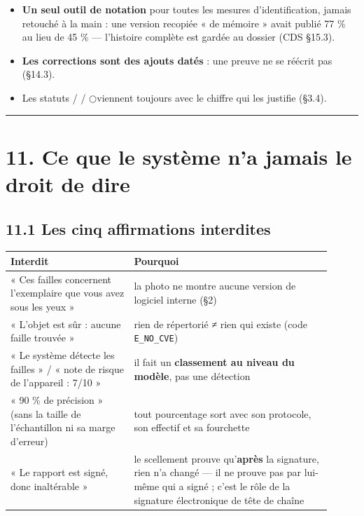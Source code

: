 \documentclass[11pt,a4paper]{article}
\newcommand{\fait}{\textcolor{green!45!black}{\ding{51}}}      %
\newcommand{\encours}{\textcolor{blue!65!black}{\ding{46}}}   %
\newcommand{\afaire}{\textcolor{orange!85!black}{$\bigcirc$}}  %
\begin{document}
\begin{itemize}  \item \textbf{Un seul outil de notation} pour toutes les mesures d'identification, jamais retouché à la main : une version recopiée « de mémoire » avait publié 77 \% au lieu de 45 \% — l'histoire complète est gardée au dossier (CDS §15.3).
\end{itemize}

\begin{itemize}  \item \textbf{Les corrections sont des ajouts datés} : une preuve ne se réécrit pas (§14.3).
\end{itemize}

\begin{itemize}  \item Les statuts \fait / \encours / \afaire viennent toujours avec le chiffre qui les justifie (§3.4).
\end{itemize}

\medskip\hrule\medskip
\section*{11. Ce que le système n'a jamais le droit de dire}
\subsection*{11.1 Les cinq affirmations interdites}
\sloppy
\begin{longtable}{|p{0.351\linewidth}|p{0.560\linewidth}|}
\hline
\textbf{Interdit} & \textbf{Pourquoi} \\ \hline
\endhead
« Ces failles concernent l'exemplaire que vous avez sous les yeux » & la photo ne montre aucune version de logiciel interne (§2) \\ \hline
« L'objet est sûr : aucune faille trouvée » & rien de répertorié ≠ rien qui existe (code \texttt{E\_\allowbreak{}NO\_\allowbreak{}CVE}) \\ \hline
« Le système détecte les failles » / « note de risque de l'appareil : 7/10 » & il fait un \textbf{classement au niveau du modèle}, pas une détection \\ \hline
« 90 \% de précision » (sans la taille de l'échantillon ni sa marge d'erreur) & tout pourcentage sort avec son protocole, son effectif et sa fourchette \\ \hline
« Le rapport est signé, donc inaltérable » & le scellement prouve qu'\textbf{après} la signature, rien n'a changé — il ne prouve pas par lui-même qui a signé ; c'est le rôle de la signature électronique de tête de chaîne \\ \hline
\end{longtable}
\end{document}
